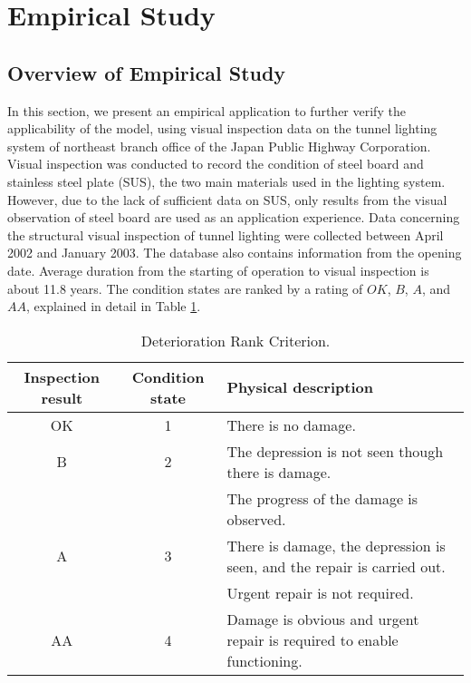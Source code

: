 \section{Empirical Study}
\label{35}
\subsection{Overview of Empirical Study}
\label{351}
In this section, we present an empirical application to further verify the applicability of the model, using visual inspection data on the tunnel lighting system of northeast branch office of the Japan Public Highway Corporation. Visual inspection was conducted to record the condition of steel board and stainless steel plate (SUS), the two main materials used in the lighting system. However, due to the lack of sufficient data on SUS, only results from the visual observation of steel board are used as an application experience. Data concerning the structural visual inspection of tunnel lighting were collected between April 2002 and January 2003. The database also contains information from the opening  date. Average duration from the starting of operation to visual inspection is about 11.8 years. The condition states are ranked by a rating of $OK$, $B$, $A$, and $AA$, explained in detail in Table \ref{table31}.

\begin{table}[t]
\begin{center}
\caption{Deterioration Rank Criterion.}
\label{table31}
{\footnotesize
\begin{tabular}{c|c|p{6cm}}
Inspection result & Condition state & Physical description \\\hline
OK & 1 & There is no damage.\\
B & 2 &The depression is not seen though there is damage.\\
 &  & The progress of the damage is observed.\\
A & 3 &  There is damage, the depression is seen, and the repair is carried out.\\
 &  &    Urgent repair is not required.\\
AA & 4 & Damage is obvious and urgent repair is required to enable functioning.\\\hline
\end{tabular}
}
\end{center}
\end{table}

